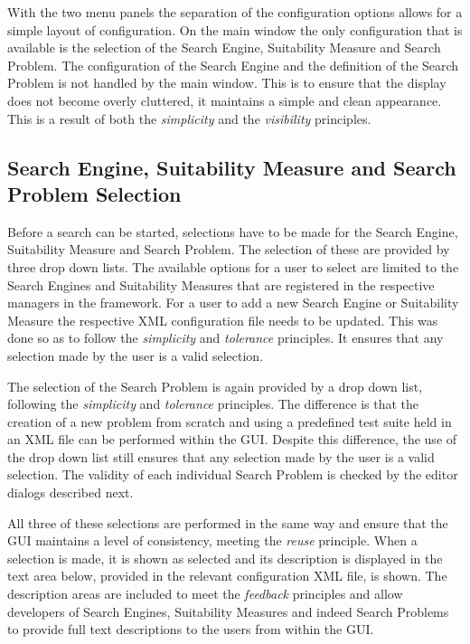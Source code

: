 With the two menu panels the separation of the configuration options allows for a simple layout of configuration.
On the main window the only configuration that is available is the selection of the Search Engine, Suitability Measure and Search Problem.
The configuration of the Search Engine and the definition of the Search Problem is not handled by the main window.
This is to ensure that the display does not become overly cluttered, it maintains a simple and clean appearance.
This is a result of both the \emph{simplicity} and the \emph{visibility} principles.

\subsection{Search Engine, Suitability Measure and Search Problem Selection}
\label{sec:seselecdes}
\label{sec:smselecdes}
\label{sec:spselecdes}
Before a search can be started, selections have to be made for the Search Engine, Suitability Measure and Search Problem.
The selection of these are provided by three drop down lists.
The available options for a user to select are limited to the Search Engines and Suitability Measures that are registered in the respective managers in the framework.
For a user to add a new Search Engine or Suitability Measure the respective XML configuration file needs to be updated.
This was done so as to follow the \emph{simplicity} and \emph{tolerance} principles.
It ensures that any selection made by the user is a valid selection.

The selection of the Search Problem is again provided by a drop down list, following the \emph{simplicity} and \emph{tolerance} principles.
The difference is that the creation of a new problem from scratch and using a predefined test suite held in an XML file can be performed within the GUI.
Despite this difference, the use of the drop down list still ensures that any selection made by the user is a valid selection.
The validity of each individual Search Problem is checked by the editor dialogs described next.

All three of these selections are performed in the same way and ensure that the GUI maintains a level of consistency, meeting the \emph{reuse} principle.
When a selection is made, it is shown as selected and its description is displayed in the text area below, provided in the relevant configuration XML file, is shown.
The description areas are included to meet the \emph{feedback} principles and allow developers of Search Engines, Suitability Measures and indeed Search Problems to provide full text descriptions to the users from within the GUI.

